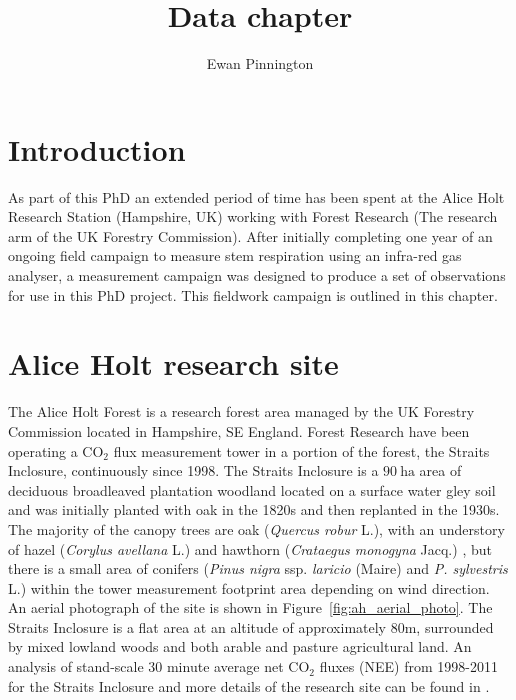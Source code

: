 \documentclass[11pt]{article}
\title{Data chapter}
\author{Ewan Pinnington}
\begin{document}
\maketitle

\section{Introduction}

As part of this PhD an extended period of time has been spent at the Alice Holt Research Station (Hampshire, UK) working with Forest Research (The research arm of the UK Forestry Commission). After initially completing one year of an ongoing field campaign to measure stem respiration using an infra-red gas analyser, a measurement campaign was designed to produce a set of observations for use in this PhD project. This fieldwork campaign is outlined in this chapter.


\section{Alice Holt research site}

The Alice Holt Forest is a research forest area managed by the UK Forestry Commission located in Hampshire, SE England. Forest Research have been operating a $\text{CO}_{2}$ flux measurement tower in a portion of the forest, the Straits Inclosure, continuously since 1998. The Straits Inclosure is a $90~\text{ha}$ area of deciduous broadleaved plantation woodland located on a surface water gley soil and was initially planted with oak in the 1820s \citep{schlich1905working} and then replanted in the 1930s. The majority of the canopy trees are oak (\textit{Quercus robur} L.), with an understory of hazel (\textit{Corylus avellana} L.) and hawthorn (\textit{Crataegus monogyna} Jacq.) \citep{pitman2001leaf}, but there is a small area of conifers (\textit{Pinus nigra} ssp. \textit{laricio} (Maire) and \textit{P. sylvestris} L.) within the tower measurement footprint area depending on wind direction. An aerial photograph of the site is shown in Figure~\ref{fig:ah_aerial_photo}. The Straits Inclosure is a flat area at an altitude of approximately 80m, surrounded by mixed lowland woods and both arable and pasture agricultural land. An analysis of stand-scale $30$ minute average net $\text{CO}_{2}$ fluxes (NEE) from 1998-2011 for the Straits Inclosure and more details of the research site can be found in \citet{wilkinson2012inter}. 
\end{document}
